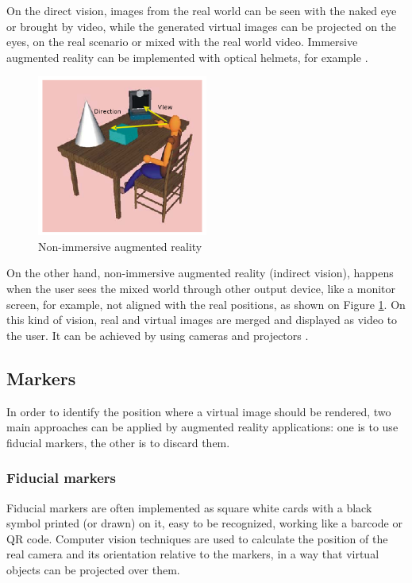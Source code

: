\documentclass[msc, a4paper, classic, en]{ufbathesis}
\begin{document}
On the direct vision, images from the real world can be seen with the naked eye or brought by video, while the generated virtual images can be projected on the eyes, on the real scenario or mixed with the real world video. Immersive augmented reality can be implemented with optical helmets, for example \cite{tori2006fundamentos}.

\begin{figure}
\centering
\includegraphics[width=0.5\textwidth]{images/indirect.png}
\caption{Non-immersive augmented reality}
\label{fig:indirect}
\end{figure}

On the other hand, non-immersive augmented reality (indirect vision), happens when the user sees the mixed world through other output device, like a monitor screen, for example, not aligned with the real positions, as shown on Figure \ref{fig:indirect}. On this kind of vision, real and virtual images are merged and displayed as video to the user. It can be achieved by using cameras and projectors \cite{tori2006fundamentos}.

\subsection{Markers}

In order to identify the position where a virtual image should be rendered, two main approaches can be applied by augmented reality applications: one is to use fiducial markers, the other is to discard them.

\subsubsection{Fiducial markers}

Fiducial markers are often implemented as square white cards with a black symbol printed (or drawn) on it, easy to be recognized, working like a barcode or QR code. Computer vision techniques are used to calculate the position of the real camera and its orientation relative to the markers, in a way that virtual objects can be projected over them.
\end{document}
